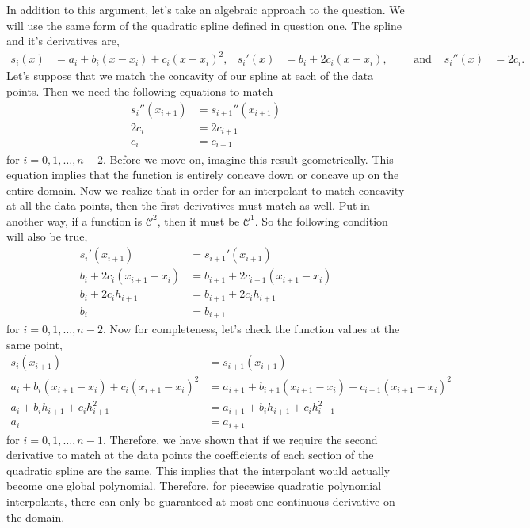 \documentclass{article}
\begin{document}
\begin{enumerate}[label = {\arabic*}]
		\hspace{15pt} In addition to this argument, let's take an algebraic approach to the question. We will use the same form of the quadratic spline defined in question one. The spline and it's derivatives are, \begin{align*}
			s_i(x) &= a_i + b_i(x - x_i) + c_i(x - x_i)^2, & s_i'(x) &= b_i + 2c_i(x - x_i), \quad\quad \text{ and } & s_i''(x) &= 2c_i.
		\end{align*}
		Let's suppose that we match the concavity of our spline at each of the data points. Then we need the following equations to match
		\begin{align*}
			s_i''(x_{i + 1}) &= s_{i + 1}''(x_{i + 1}) \\
					   2 c_i &= 2 c_{i + 1} \\
					     c_i &=   c_{i + 1}
		\end{align*}
		for $ i = 0, 1, \dots , n - 2$. Before we move on, imagine this result geometrically. This equation implies that the function is entirely concave down or concave up on the entire domain. Now we realize that in order for an interpolant to match concavity at all the data points, then the first derivatives must match as well. Put in another way, if a function is $\mathcal{C}^2$, then it must be $\mathcal{C}^1.$ So the following condition will also be true,
		\begin{align*}
			      s_i'(x_{i + 1}) 		&= s_{i + 1} '(x_{i + 1}) \\
			b_i + 2c_i(x_{i + 1} - x_i) &= b_{i + 1} + 2c_{i + 1}(x_{i + 1} - x_i) \\
			b_i + 2c_i h_{i + 1} 		&= b_{i + 1} + 2c_ih_{i + 1} \\
			b_i 						&= b_{i + 1} 
		\end{align*}
		for $ i = 0, 1, \dots , n - 2$. Now for completeness, let's check the function values at the same point, 
		\begin{align*}
				  s_i(x_{i + 1}) 								&= s_{i + 1}(x_{i + 1}) \\
			a_i + b_i(x_{i + 1} - x_i) + c_i(x_{i + 1} - x_i)^2 &= a_{i + 1} + b_{i + 1}(x_{i + 1} - x_i) + c_{i + 1}(x_{i + 1} - x_i)^2 \\
			a_i + b_i h_{i + 1} +        c_i h_{i + 1}^2 		&= a_{i + 1} + b_ih_{i + 1} + c_ih_{i + 1}^2 \\
			a_i 												&= a_{i + 1}
		\end{align*}
		for $ i = 0, 1, \dots , n - 1$. Therefore, we have shown that if we require the second derivative to match at the data points the coefficients of each section of the quadratic spline are the same. This implies that the interpolant would actually become one global polynomial. Therefore, for piecewise quadratic polynomial interpolants, there can only be guaranteed at most one continuous derivative on the domain. \\
		

\end{enumerate}
\end{document}
